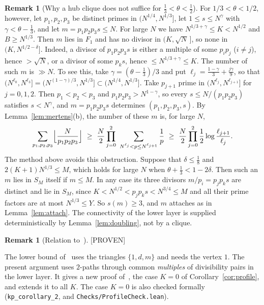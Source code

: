 \documentclass[11pt]{amsart}
\theoremstyle{definition}
\newtheorem{remark}[theorem]{Remark}
\newcommand{\status}[1]{\textup{\textsf{[#1]}}}
\newcommand{\lean}[1]{\ifhmode\unskip\par\fi{\noindent\footnotesize\raggedright\textup{\textsf{Lean:}}\ \texttt{\detokenize{#1}}\par}}
\begin{document}
\begin{remark}[Why a hub clique does not suffice for $\frac13<\theta<\frac12$]
For $1/3<\theta<1/2$, however, let $p_1,p_2,p_3$ be distinct primes in $(N^{1/4},N^{1/3}]$, let $1\le s\le N^{\gamma}$ with $\gamma<\theta-\frac13$, and let $m=p_1p_2p_3s\le N$. For large $N$ we have $N^{1/3+\gamma}\le K<N^{1/2}$ and $B\ge N^{1/3}$. Then $m$ lies in $F_1$ and has no divisor in $(K,\sqrt N\,]$, so none in $(K,N^{1/2-\delta}]$. Indeed, a divisor of $p_1p_2p_3s$ is either a multiple of some $p_ip_j$ ($i\ne j$), hence $>\sqrt N$, or a divisor of some $p_ks$, hence $\le N^{1/3+\gamma}\le K$. The number of such $m$ is $\gg N$. To see this, take $\gamma=(\theta-\frac13)/3$ and put $\ell_j=\frac{1-\gamma}3+\frac{j\gamma}9$, so that $(N^{\ell_0},N^{\ell_3}]=(N^{(1-\gamma)/3},N^{1/3}]\subset(N^{1/4},N^{1/3}]$. Take $p_{j+1}$ prime in $(N^{\ell_j},N^{\ell_{j+1}}]$ for $j=0,1,2$. Then $p_1<p_2<p_3$ and $p_1p_2p_3>N^{1-\gamma}$, so every $s\le N/(p_1p_2p_3)$ satisfies $s<N^\gamma$, and $m=p_1p_2p_3s$ determines $(p_1,p_2,p_3,s)$. By Lemma~\ref{lem:mertens}(b), the number of these $m$ is, for large $N$,
\[
\sum_{p_1,p_2,p_3}\Bigl\lfloor\frac N{p_1p_2p_3}\Bigr\rfloor\ \ge\ \frac N2\prod_{j=0}^{2}\ \sum_{N^{\ell_j}<p\le N^{\ell_{j+1}}}\frac1p\ \ge\ \frac N2\prod_{j=0}^{2}\frac12\log\frac{\ell_{j+1}}{\ell_j}.
\] The method above avoids this obstruction. Suppose that $\delta\le\frac18$ and $2(K+1)N^{1/3}\le M$, which holds for large $N$ when $\theta+\frac13<1-2\delta$. Then such an $m$ lies in $S_M$ itself if $m\le M$. In any case its three divisors $m/p_i=p_jp_ks$ are distinct and lie in $S_M$, since $K<N^{1/2}<p_jp_ks<N^{3/4}\le M$ and all their prime factors are at most $N^{1/3}\le Y$. So $s(m)\ge3$, and $m$ attaches as in Lemma~\ref{lem:attach}. The connectivity of the lower layer is supplied deterministically by Lemma~\ref{lem:doubling}, not by a clique.
\end{remark}

\begin{remark}[Relation to~\cite{KP}]\label{rem:KP}\status{PROVEN}\lean{kp_corollary_2}
The lower bound of~\cite{KP} uses the triangles $\{1,d,m\}$ and needs the vertex $1$. The present argument uses $2$-paths through common \emph{multiples} of divisibility pairs in the lower layer. It gives a new proof of~\cite[Corollary~2]{KP}, the case $K=0$ of Corollary~\ref{cor:profile}, and extends it to all $K$. The case $K=0$ is also checked formally (\texttt{kp\_corollary\_2}, and \texttt{Checks/ProfileCheck.lean}).
\end{remark}


\appendix
\end{document}
